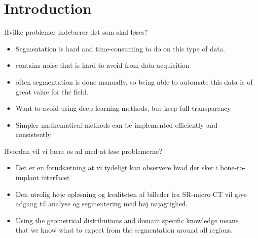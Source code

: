 
\section*{Introduction}

 \item Hvilke problemer indebærer det som skal løses?
     \begin{itemize}
     	\item Segmentation is hard and time-consuming to do on this type of data.
     	\item contains noise that is hard to avoid from data acquisition
     	\item often segmentation is done manually, so being able to automate this data is of great value for the field.
     	\item Want to avoid using deep learning methods, but keep full transparency 
     	\item Simpler mathematical methods can be implemented efficiently and consistently
     \end{itemize}
 \item Hvordan vil vi bære os ad med at løse problemerne?
     \begin{itemize}
     	\item Det er en forudsætning at vi tydeligt kan observere hvad der sker i bone-to-implant interfacet
     	\item Den utrolig høje opløsning og kvaliteten af billeder fra SR-micro-CT vil give adgang til analyse og segmentering med høj nøjagtighed.
     	\item Using the geometrical distributions and domain specific knowledge means that we know what to expect from the segmentation around all regions.
     \end{itemize}